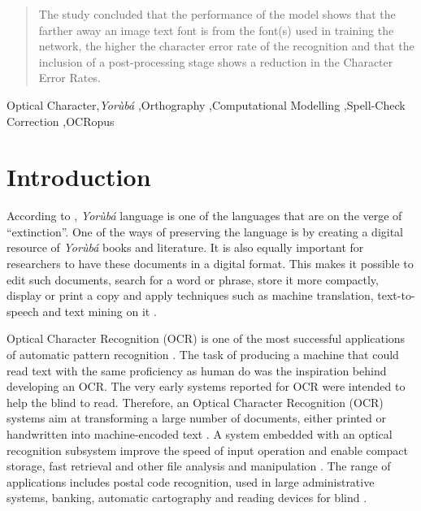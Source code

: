 \documentclass[review]{elsarticle}
\newcommand{\q}[1]{``#1''}
\newcommand{\yor}{\textit{Yor\`ub\'a }}
\begin{document}
\begin{frontmatter}
\begin{abstract}
	The study concluded that the performance of the model shows that the farther away an image text font is from the font(s) used in training the network, the higher the character error rate of the recognition and that the inclusion of a post-processing stage shows a reduction in the Character Error Rates.
\end{abstract}

\begin{keyword}
	Optical Character\sep \yor \sep Orthography \sep Computational Modelling \sep Spell-Check Correction \sep OCRopus
\end{keyword}

\end{frontmatter}

\linenumbers

\section{Introduction}
According to \cite{fabunmi2005yoruba}, \yor language is one of the languages that are on the verge of \q{extinction}. One of the ways of preserving the language is by creating a digital resource of \yor books and literature. It is also equally important for researchers to have these documents in a digital format. This makes it possible to edit such documents, search for a word or phrase, store it more compactly, display or print a copy and apply techniques such as machine translation, text-to-speech and text mining on it \cite{isheawy2015optical}.

Optical Character Recognition (OCR) is one of the most successful applications of automatic pattern recognition \cite{trier1996feature}. The task of producing a machine that could read text with the same proficiency as human do was the inspiration behind developing an OCR. The very early systems reported for OCR were intended to help the blind to read. Therefore, an Optical Character Recognition (OCR) systems aim at transforming a large number of documents, either printed or handwritten into machine-encoded text \cite{kavallieratou2002skew}. A system embedded with an optical recognition subsystem improve the speed of input operation and enable compact storage, fast retrieval and other file analysis and manipulation \cite{shah2009ocr}. The range of applications includes postal code recognition, used in large administrative systems, banking, automatic cartography and reading devices for blind \cite{mani1997application}. 
\end{document}

